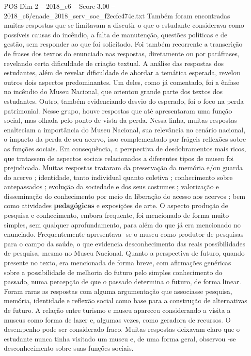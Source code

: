 \begin{textsample}{POS Dim 2 – 2018\_c6 – Score 3.00 – 2018\_c6/enade\_2018\_serv\_soc\_f2ecfc474e.txt}
Também foram encontradas muitas respostas que se limitavam a discutir o que o estudante considerava como possíveis causas do incêndio, a falta de manutenção, questões políticas e de gestão, sem responder ao que foi solicitado.
Foi também recorrente a transcrição de frases dos textos do enunciado nas respostas, diretamente ou por paráfrases, revelando certa dificuldade de criação textual.
A análise das respostas dos estudantes, além de revelar dificuldade de abordar a temática esperada, revelou outros dois aspectos predominantes.
Um deles, como já comentado, foi a ênfase no incêndio do Museu Nacional, que orientou grande parte dos textos dos estudantes.
Outro, também evidenciando desvio do esperado, foi o foco na perda patrimonial.
Nesse grupo, houve respostas que até apresentaram uma função social, mas olhada pelo ponto de vista da perda.
Nessa linha, muitas respostas enalteciam a importância do Museu Nacional, sua relevância no cenário nacional, o impacto da perda de seu acervo, isso complementado por frágeis reflexões sobre as funções sociais.
Em consequência, a perspectiva de desdobramentos mais ricos, que tratassem de aspectos sociais relacionados a diferentes tipos de museu foi prejudicada.
Muitas respostas trataram da preservação da memória e/ou guarda do acervo ; identidade, tanto individual quanto coletiva ; conhecimento sobre antepassados ; evolução da sociedade e dos seus costumes ; valorização e disseminação do conhecimento por meio da liberação do acesso aos acervos ; bem como atividades \textbf{pedagógicas} e exposições de arte.
O aspecto produção de pesquisa e conhecimento, embora frequente, foi mencionado de forma muito simples, sem qualquer aprofundamento, para além do que já era mencionado no enunciado.
Frequentemente apresentava -se o museu como produtor de pesquisas para o campo da saúde, o que evidencia desconhecimento das reais possibilidades de pesquisa, mesmo no Museu Nacional.
Quanto a perspectiva de futuro, quando presente no texto, era mencionada de forma breve, com afirmações genéricas sobre a possibilidade de melhoria do futuro pelo simples conhecimento do passado, numa percepção de que o passado determina o futuro, de forma linear.
Foram raras as respostas com alguma argumentação que associasse pesquisa, memória, identidade e reflexão social como base para a construção de alternativas de futuro.
A relação entre turismo e museu apareceu considerando a visita a museus como forma de lazer e, algumas vezes, como geradora de recursos.
O desempenho pode ser considerado fraco.
Muitas respostas deixavam claro que o estudante nunca tinha visitado um museu e, de uma forma geral, observou -se desconhecimento sobre suas funções sociais.

\end{textsample}
